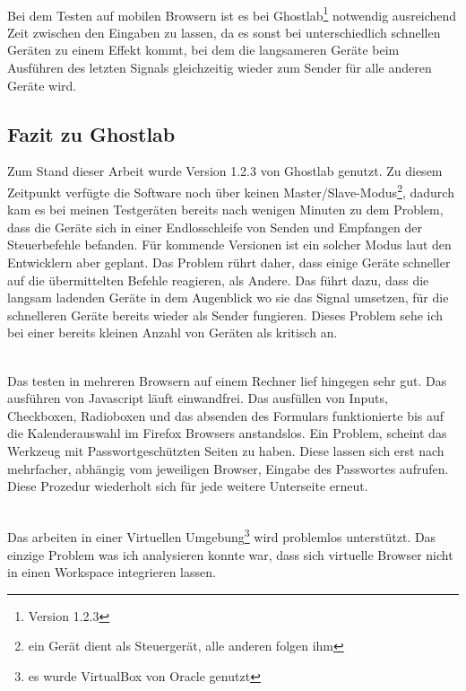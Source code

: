 		\\Bei dem Testen auf mobilen Browsern ist es bei Ghostlab\footnote{Version 1.2.3} notwendig ausreichend Zeit zwischen 		den Eingaben zu lassen, da es sonst bei unterschiedlich schnellen Geräten zu einem Effekt kommt, bei dem die 				langsameren Geräte beim Ausführen des letzten Signals gleichzeitig wieder zum Sender für alle anderen Geräte wird.
		
		\pagebreak
		
		\subsection{Fazit zu Ghostlab}
		Zum Stand dieser Arbeit wurde Version 1.2.3 von Ghostlab genutzt. Zu diesem Zeitpunkt verfügte die Software noch über 		keinen Master/Slave-Modus\footnote{ein Gerät dient als Steuergerät, alle anderen folgen ihm}, dadurch kam es bei meinen 		Testgeräten bereits nach wenigen Minuten zu dem Problem, dass die Geräte sich in einer 								Endlosschleife von Senden und Empfangen der Steuerbefehle befanden. Für kommende Versionen ist ein solcher Modus 		laut den Entwicklern aber geplant. Das Problem rührt daher, dass einige Geräte schneller auf die übermittelten Befehle 			reagieren, als Andere. Das führt dazu, dass die langsam ladenden Geräte in dem Augenblick wo sie das Signal umsetzen, 		für die schnelleren Geräte bereits wieder als Sender fungieren. Dieses Problem sehe ich bei einer bereits kleinen Anzahl 			von Geräten als kritisch an. 

		\\Das testen in mehreren Browsern auf einem Rechner lief hingegen sehr gut. Das ausführen von Javascript läuft 				einwandfrei. Das ausfüllen von Inputs, Checkboxen, Radioboxen und das absenden des Formulars funktionierte bis auf die 		Kalenderauswahl im Firefox Browsers anstandslos. Ein Problem, scheint das Werkzeug mit Passwortgeschützten Seiten zu 		haben. Diese lassen sich erst nach mehrfacher, abhängig vom jeweiligen Browser, Eingabe des Passwortes aufrufen. 			Diese Prozedur wiederholt sich für jede weitere Unterseite erneut. 

		\\Das arbeiten in einer Virtuellen Umgebung\footnote{es wurde VirtualBox von Oracle genutzt} wird problemlos unterstützt. 		Das einzige Problem was ich analysieren konnte war, dass sich virtuelle Browser nicht in einen Workspace integrieren 			lassen.

